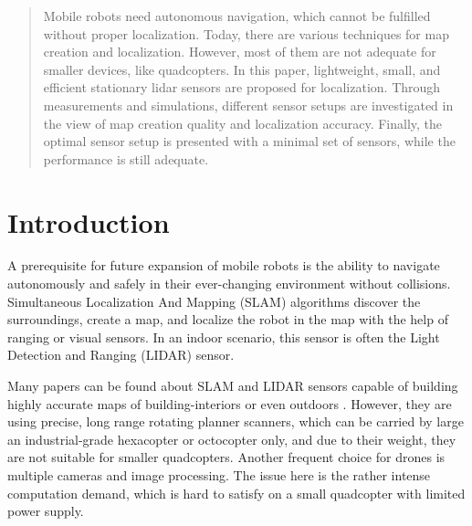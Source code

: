 \documentclass[conference]{IEEEtran}
\begin{document}
\begin{abstract}
Mobile robots need autonomous navigation, which cannot be fulfilled without proper localization. Today, there are various techniques for map creation and localization. However, most of them are not adequate for smaller devices, like quadcopters. In this paper, lightweight, small, and efficient stationary lidar sensors are proposed for localization. Through measurements and simulations, different sensor setups are investigated in the view of map creation quality and localization accuracy. Finally, the optimal sensor setup is presented with a minimal set of sensors, while the performance is still adequate.
\end{abstract}



%
\IEEEpeerreviewmaketitle



\section{Introduction}
A prerequisite for future expansion of mobile robots is the ability to navigate autonomously and safely in 
their ever-changing environment without collisions. Simultaneous Localization And Mapping (SLAM) algorithms
discover the surroundings, create a map, and localize the robot in the map with the help of ranging or visual 
sensors. In an indoor scenario, this sensor is often the Light Detection and Ranging (LIDAR) sensor. 

Many papers can be found about SLAM and LIDAR sensors capable of building highly accurate maps of building-interiors or even outdoors \cite{engel2014lsd} \cite{mur2015orb} \cite{engel2015large}. However, they are using precise, long range rotating planner scanners,
which can be carried by large an industrial-grade hexacopter or octocopter only, and due to their weight, they are
not suitable for smaller quadcopters. Another frequent choice for drones is multiple cameras and image processing.
The issue here is the rather intense computation demand, which is hard to satisfy on a small quadcopter with 
limited power supply. 
\end{document}
